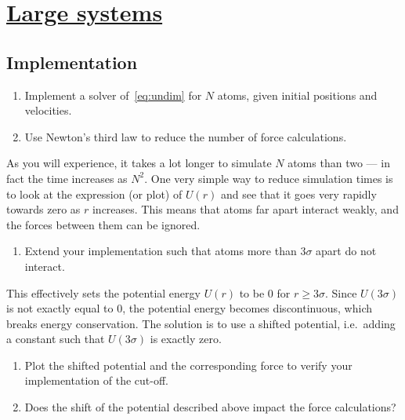 \documentclass[11pt,british,a4paper]{report}
\begin{document}
\section{\underline{Large systems}}

\subsection{Implementation}
\begin{enumerate}[label=\roman*.]
    \item Implement a solver of~\vref{eq:undim} for \(N\) atoms, given initial positions and velocities.
    \item Use Newton's third law to reduce the number of force calculations.
\end{enumerate}

As you will experience, it takes a lot longer to simulate \(N\) atoms than two --- in fact the time increases as \(N^2\). One very simple way to reduce simulation times is to look at the expression (or plot) of \(U(r)\) and see that it goes very rapidly towards zero as \(r\) increases. This means that atoms far apart interact weakly, and the forces between them can be ignored.

\begin{enumerate}[label=\roman*., resume]
    \item Extend your implementation such that atoms more than \(3\sigma\) apart do not interact.
\end{enumerate}

This effectively sets the potential energy \(U(r)\) to be \(0\) for \(r\geq 3\sigma\). Since \(U(3\sigma)\) is not exactly equal to \(0\), the potential energy becomes discontinuous, which breaks energy conservation. The solution is to use a shifted potential, i.e.\ adding a constant such that \(U(3\sigma)\) is exactly zero.

\begin{enumerate}[label=\roman*., resume]
    \item Plot the shifted potential and the corresponding force to verify your implementation of the cut-off.
    \item Does the shift of the potential described above impact the force calculations?
\end{enumerate}
\end{document}
